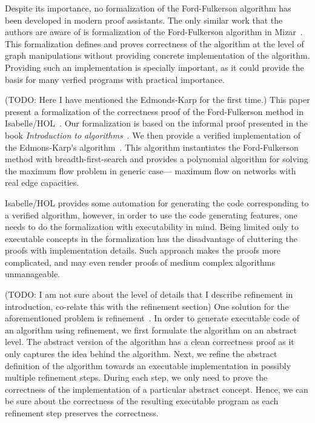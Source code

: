 \documentclass{llncs}
\begin{document}
Despite its importance, no formalization of the Ford-Fulkerson algorithm has been developed in modern proof assistants. The only similar work that the authors are aware of is formalization of the Ford-Fulkerson algorithm in Mizar~\cite{Lee05}. This formalization defines and proves correctness of the algorithm at the level of graph manipulations without providing concrete implementation of the algorithm. Providing such an implementation is specially important, as it could provide the basis for many verfied programs with practical importance.

(TODO: Here I have mentioned the Edmonds-Karp for the first time.) This paper present a formalization of the correctness proof of the Ford-Fulkerson method in Isabelle/HOL~\cite{NPW02}. Our formalization is based on the informal proof presented in the book \emph{Introduction to algorithms}~\cite{CLRS09}. We then provide a verified implementation of the Edmons-Karp's algorithm~\cite{EK72}. This algorithm instantiates the Ford-Fulkerson method with breadth-first-search and provides a polynomial algorithm for solving the maximum flow problem in generic case--- maximum flow on networks with real edge capacities.

Isabelle/HOL provides some automation for generating the code corresponding to a verified algorithm, however, in order to use the code generating features, one needs to do the formalization with executability in mind. Being limited only to executable concepts in the formalization has the disadvantage of cluttering the proofs with implementation details. Such approach makes the proofs more complicated, and may even render proofs of medium complex algorithms unmanageable.

(TODO: I am not sure about the level of details that I describe refinement in introduction, co-relate this with the refinement section) One solution for the aforementioned problem is refinement~\cite{Wirth71}. In order to generate executable code of an algorithm using refinement, we first formulate the algorithm on an abstract level. The abstract version of the algorithm has a clean correctness proof as it only captures the idea behind the algorithm. Next, we refine the abstract definition of the algorithm towards an executable implementation in possibly multiple refinement steps. During each step, we only need to prove the correctness of the implementation of a particular abstract concept. Hence, we can be sure about the correctness of the resulting executable program as each refinement step preserves the correctness.
\end{document}
